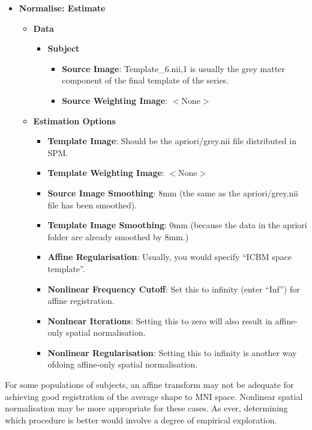 \begin{itemize}
\item{{\bf Normalise: Estimate}
  \begin{itemize}
  \item{{\bf Data}
    \begin{itemize}
    \item{{\bf Subject}
      \begin{itemize}
      \item{{\bf Source Image}: Template\_6.nii,1 is usually the grey matter component of the final template of the series.}
      \item{{\bf Source Weighting Image}: $<$None$>$}
      \end{itemize}
    }
    \end{itemize}
  }
  \item{{\bf Estimation Options}
    \begin{itemize}
    \item{{\bf Template Image}: Should be the apriori/grey.nii file distributed in SPM.}
    \item{{\bf Template Weighting Image}: $<$None$>$}
    \item{{\bf Source Image Smoothing}: 8mm (the same as the apriori/grey.nii file has been smoothed).}
    \item{{\bf Template Image Smoothing}: 0mm (because the data in the apriori folder are already smoothed by 8mm.)}
    \item{{\bf Affine Regularisation}: Usually, you would specify ``ICBM space template''.}
    \item{{\bf Nonlinear Frequency Cutoff}: Set this to infinity (enter ``Inf'') for affine registration.}
    \item{{\bf Nonlnear Iterations}: Setting this to zero will also result in affine-only spatial normalisation.}
    \item{{\bf Nonlinear Regularisation}: Setting this to infinity is another way ofdoing affine-only spatial normalisation.}
    \end{itemize}
  }
  \end{itemize}
}
\end{itemize}

For some populations of subjects, an affine transform may not be adequate for achieving good registration of the average shape to MNI space.
Nonlinear spatial normalisation may be more appropriate for these cases.
As ever, determining which procedure is better would involve a degree of empirical exploration.

